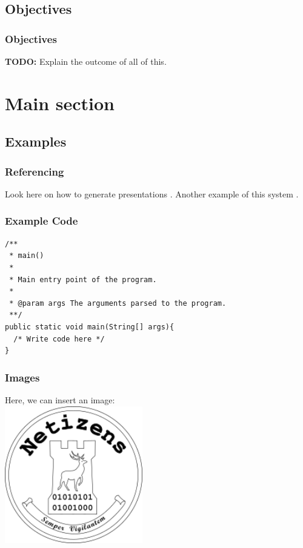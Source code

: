 \documentclass{beamer}
\begin{document}
    \subsection{Objectives}
      \begin{frame}
        \frametitle{Objectives}
        \textbf{TODO:} Explain the outcome of all of this.
      \end{frame}
  \section{Main section}
    \subsection{Examples}
      \begin{frame}
        \frametitle{Referencing}
        Look here on how to generate presentations \cite{Autor1990}. Another
        example of this system \cite{Jemand2000}.
      \end{frame}
      \begin{frame}[containsverbatim]
        \frametitle{Example Code}
        \begin{lstlisting}
/**
 * main()
 *
 * Main entry point of the program.
 *
 * @param args The arguments parsed to the program.
 **/
public static void main(String[] args){
  /* Write code here */
}
        \end{lstlisting}
      \end{frame}
      \begin{frame}
        \frametitle{Images}
        Here, we can insert an image:
        \\
        \includegraphics[height=6cm,width=6cm]{logo-black}
      \end{frame}
\end{document}
